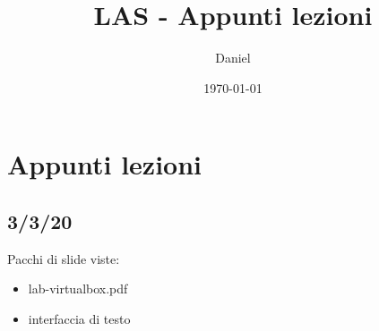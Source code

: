 \documentclass[12pt]{article}
\title{LAS - Appunti lezioni}
\author{Daniel}
\date{\today{}}
\begin{document}
	
	\maketitle
	\newpage
	
	\section*{Appunti lezioni}
		\subsection{3/3/20}
		Pacchi di slide viste:
		\begin{itemize}
			\item lab-virtualbox.pdf
			\item interfaccia di testo
		\end{itemize}
\end{document}
